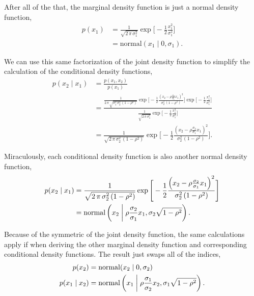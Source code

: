 \documentclass[11pt, oneside]{article}
\begin{document}
After all of the that, the marginal density function is just a normal density function,
%
\begin{align*}
p ( x_{1} )
&=
\frac{1}{ \sqrt{2 \, \pi \, \sigma_{1}^{2} } }
\exp \Bigg[
  -\frac{1}{2} \frac{  x_{1}^{2} }{ \sigma_{1}^{2} }
\Bigg]
\\
&=
\text{normal} ( x_{1} \mid 0, \sigma_{1} ).
\end{align*}

We can use this same factorization of the joint density function to simplify the calculation of the
conditional density functions,
%
\begin{align*}
p ( x_{2} \mid x_{1} )
&=
\frac{ p ( x_{1},  x_{2} ) }{ p ( x_{1} ) }
\\
&=
\frac{
  \frac{1}{ 2 \, \pi \, \sqrt{ \sigma_{1}^{2} \, \sigma_{2}^{2} \, (1 - \rho^{2} ) } }
  \exp \Bigg[
    -\frac{1}{2}
        \frac{ 
        \left(
          x_{2} - \rho \frac{ \sigma_{2} }{ \sigma_{1} } x_{1}
        \right)^{2}
      }{
        \sigma_{2}^{2} \, (1 - \rho^{2} )
      }
  \Bigg]
  \exp \Bigg[
    -\frac{1}{2} \frac{  x_{1}^{2} }{ \sigma_{1}^{2} }
  \Bigg]
}{
  \frac{1}{ \sqrt{2 \, \pi \, \sigma_{1}^{2} } }
  \exp \Bigg[
    -\frac{1}{2} \frac{  x_{1}^{2} }{ \sigma_{1}^{2} }
  \Bigg]
}
\\
&=
\frac{1}{ \sqrt{ 2 \, \pi \, \sigma_{2}^{2} \, (1 - \rho^{2} ) } }
\exp \Bigg[
  -\frac{1}{2}
      \frac{ 
      \left(
        x_{2} - \rho \frac{ \sigma_{2} }{ \sigma_{1} } x_{1}
      \right)^{2}
    }{
      \sigma_{2}^{2} \, (1 - \rho^{2} )
    }
\Bigg].
\end{align*}

Miraculously, each conditional density function is also another normal density function,
%
\begin{align*}
p ( x_{2} \mid x_{1} )
&=
\frac{1}{ \sqrt{ 2 \, \pi \, \sigma_{2}^{2} \, (1 - \rho^{2} ) } }
\exp \Bigg[
  -\frac{1}{2}
      \frac{ 
      \left(
        x_{2} - \rho \frac{ \sigma_{2} }{ \sigma_{1} } x_{1}
      \right)^{2}
    }{
      \sigma_{2}^{2} \, (1 - \rho^{2} )
    }
\Bigg]
\\
&=
\text{normal} \left( 
  x_{2} \biggm| 
  \rho \frac{ \sigma_{2} }{ \sigma_{1} } x_{1}, 
  \sigma_{2} \sqrt{ 1 - \rho^{2} } 
\right).
\end{align*}

Because of the symmetric of the joint density function, the same calculations apply if 
when deriving the other marginal density function and corresponding conditional 
density functions.  The result just swaps all of the indices,
%
\begin{align*}
p ( x_{2} )
&=
\text{normal} ( x_{2} \mid 0, \sigma_{2} )
\\
p ( x_{1} \mid x_{2} )
&=
\text{normal} \left( 
  x_{1} \biggm| 
  \rho \frac{ \sigma_{1} }{ \sigma_{2} } x_{2}, 
  \sigma_{1} \sqrt{ 1 - \rho^{2} } 
\right).
\end{align*}
\end{document}
